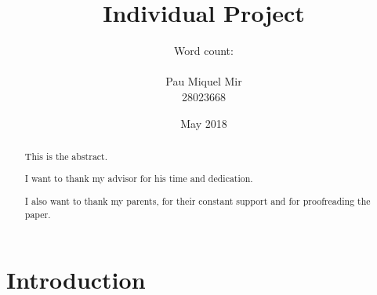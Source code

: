 \documentclass[11pt ,twoside]{article}
\numberwithin{equation}{section}
\newcommand{\candidatenum}{28023668} %
\begin{document}


\title{Individual Project}
\author{
Word count: \\ \\
\vspace{0.1cm}
Pau Miquel Mir\\
\vspace{0.1cm}
\candidatenum \\
}
\date{May 2018}

\maketitle

\cleardoublepage



\begin{abstract}
%

This is the abstract.

\end{abstract}

\cleardoublepage


\renewcommand{\abstractname}{Acknowledgements}
\begin{abstract}	
%

I want to thank my advisor for his time and dedication.
 
 I also want to thank my parents, for their constant support and for proofreading the paper. 


\end{abstract}

\cleardoublepage


\setcounter{tocdepth}{3}

\tableofcontents

\cleardoublepage





\section{Introduction}
\label{sec:introduction}

\end{document}
